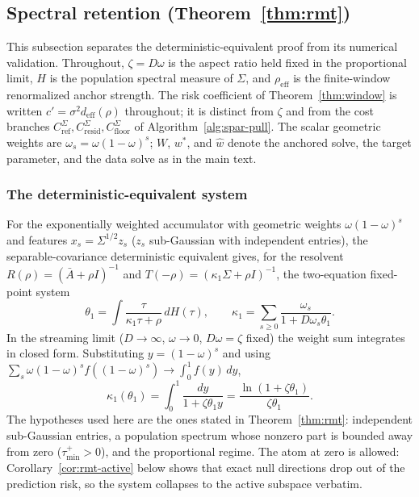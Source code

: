 \subsection{Spectral retention (Theorem~\ref{thm:rmt})}
\label{app:rmt}

This subsection separates the deterministic-equivalent proof from its numerical validation.
Throughout, $\zeta = D\omega$ is the aspect ratio held fixed in the proportional limit, $H$ is the population spectral measure of $\Sigma$, and $\rho_{\mathrm{eff}}$ is the finite-window renormalized anchor strength.
The risk coefficient of Theorem~\ref{thm:window} is written $c' = \sigma^2 d_{\mathrm{eff}}(\rho)$ throughout; it is distinct from $\zeta$ and from the cost branches $C^\Sigma_{\mathrm{ref}}, C^\Sigma_{\mathrm{resid}}, C^\Sigma_{\mathrm{floor}}$ of Algorithm~\ref{alg:spar-pull}.
The scalar geometric weights are $\omega_s = \omega(1-\omega)^s$; $W$, $w^*$, and $\widehat w$ denote the anchored solve, the target parameter, and the data solve as in the main text.

\subsubsection{The deterministic-equivalent system}
\label{app:rmt-system}

For the exponentially weighted accumulator with geometric weights $\omega(1-\omega)^s$ and features $x_s = \Sigma^{1/2} z_s$ ($z_s$ sub-Gaussian with independent entries), the separable-covariance deterministic equivalent \citep{silverstein1995,rubio2011,hachem2007} gives, for the resolvent $R(\rho) = (\bar A + \rho I)^{-1}$ and $T(-\rho) = (\kappa_1 \Sigma + \rho I)^{-1}$, the two-equation fixed-point system
\begin{equation}
\label{eq:rmt-system}
\theta_1 = \int \frac{\tau}{\kappa_1 \tau + \rho}\, dH(\tau),
\qquad
\kappa_1 = \sum_{s \ge 0} \frac{\omega_s}{1 + D \omega_s \theta_1}.
\end{equation}
In the streaming limit ($D \to \infty$, $\omega \to 0$, $D \omega = \zeta$ fixed) the weight sum integrates in closed form.
Substituting $y = (1-\omega)^s$ and using $\sum_s \omega (1-\omega)^s f((1-\omega)^s) \to \int_0^1 f(y)\,dy$,
\begin{equation}
\label{eq:rmt-kappa}
\kappa_1(\theta_1)
= \int_0^1 \frac{dy}{1 + \zeta \theta_1 y}
= \frac{\ln(1 + \zeta \theta_1)}{\zeta \theta_1}.
\end{equation}
The hypotheses used here are the ones stated in Theorem~\ref{thm:rmt}: independent sub-Gaussian entries, a population spectrum whose nonzero part is bounded away from zero ($\tau_{\min}^+ > 0$), and the proportional regime.
The atom at zero is allowed: Corollary~\ref{cor:rmt-active} below shows that exact null directions drop out of the prediction risk, so the system collapses to the active subspace verbatim.

